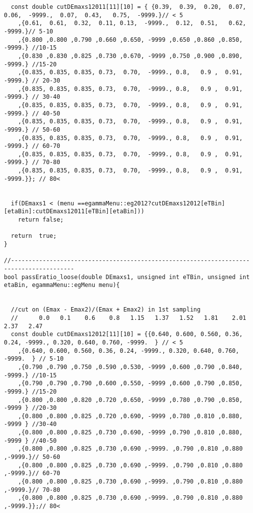 \begin{lstlisting}
  const double cutDEmaxs12011[11][10] = { {0.39,  0.39,  0.20,  0.07, 0.06,  -9999.,  0.07,  0.43,   0.75,  -9999.}// < 5  
	,{0.61,  0.61,  0.32,  0.11, 0.13,  -9999.,  0.12,  0.51,   0.62,  -9999.}// 5-10
	,{0.800 ,0.800 ,0.790 ,0.660 ,0.650, -9999 ,0.650 ,0.860 ,0.850, -9999.} //10-15
	,{0.830 ,0.830 ,0.825 ,0.730 ,0.670, -9999 ,0.750 ,0.900 ,0.890, -9999.} //15-20
	,{0.835, 0.835, 0.835, 0.73,  0.70,  -9999., 0.8,   0.9 ,  0.91,  -9999.} // 20-30 
	,{0.835, 0.835, 0.835, 0.73,  0.70,  -9999., 0.8,   0.9 ,  0.91,  -9999.} // 30-40
	,{0.835, 0.835, 0.835, 0.73,  0.70,  -9999., 0.8,   0.9 ,  0.91,  -9999.} // 40-50
	,{0.835, 0.835, 0.835, 0.73,  0.70,  -9999., 0.8,   0.9 ,  0.91,  -9999.} // 50-60 
	,{0.835, 0.835, 0.835, 0.73,  0.70,  -9999., 0.8,   0.9 ,  0.91,  -9999.} // 60-70
	,{0.835, 0.835, 0.835, 0.73,  0.70,  -9999., 0.8,   0.9 ,  0.91,  -9999.} // 70-80
	,{0.835, 0.835, 0.835, 0.73,  0.70,  -9999., 0.8,   0.9 ,  0.91,  -9999.}}; // 80<


  if(DEmaxs1 < (menu ==egammaMenu::eg2012?cutDEmaxs12012[eTBin][etaBin]:cutDEmaxs12011[eTBin][etaBin]))
    return false;
    
  return  true;
}

//----------------------------------------------------------------------------------------
bool passEratio_loose(double DEmaxs1, unsigned int eTBin, unsigned int etaBin, egammaMenu::egMenu menu){
  
  
  //cut on (Emax - Emax2)/(Emax + Emax2) in 1st sampling 
  //      0.0   0.1    0.6    0.8   1.15   1.37   1.52   1.81    2.01   2.37   2.47
  const double cutDEmaxs12012[11][10] = {{0.640, 0.600, 0.560, 0.36, 0.24, -9999., 0.320, 0.640, 0.760, -9999.  } // < 5  
	,{0.640, 0.600, 0.560, 0.36, 0.24, -9999., 0.320, 0.640, 0.760, -9999.  } // 5-10  
	,{0.790 ,0.790 ,0.750 ,0.590 ,0.530, -9999 ,0.600 ,0.790 ,0.840, -9999.} //10-15
	,{0.790 ,0.790 ,0.790 ,0.600 ,0.550, -9999 ,0.600 ,0.790 ,0.850, -9999.} //15-20
	,{0.800 ,0.800 ,0.820 ,0.720 ,0.650, -9999 ,0.780 ,0.790 ,0.850, -9999 } //20-30
	,{0.800 ,0.800 ,0.825 ,0.720 ,0.690, -9999 ,0.780 ,0.810 ,0.880, -9999 } //30-40
	,{0.800 ,0.800 ,0.825 ,0.730 ,0.690, -9999 ,0.790 ,0.810 ,0.880, -9999 } //40-50
	,{0.800 ,0.800 ,0.825 ,0.730 ,0.690 ,-9999. ,0.790 ,0.810 ,0.880 ,-9999.}// 50-60  
	,{0.800 ,0.800 ,0.825 ,0.730 ,0.690 ,-9999. ,0.790 ,0.810 ,0.880 ,-9999.}// 60-70
	,{0.800 ,0.800 ,0.825 ,0.730 ,0.690 ,-9999. ,0.790 ,0.810 ,0.880 ,-9999.}// 70-80
	,{0.800 ,0.800 ,0.825 ,0.730 ,0.690 ,-9999. ,0.790 ,0.810 ,0.880 ,-9999.}};// 80<  
  

\end{lstlisting}
